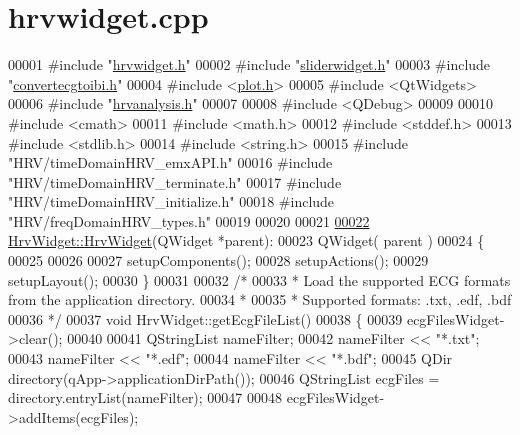 \hypertarget{hrvwidget_8cpp_source}{}\section{hrvwidget.\+cpp}
\label{hrvwidget_8cpp_source}

\begin{DoxyCode}
00001 \textcolor{preprocessor}{#include "\hyperlink{hrvwidget_8h}{hrvwidget.h}"}
00002 \textcolor{preprocessor}{#include "\hyperlink{sliderwidget_8h}{sliderwidget.h}"}
00003 \textcolor{preprocessor}{#include "\hyperlink{convertecgtoibi_8h}{convertecgtoibi.h}"}
00004 \textcolor{preprocessor}{#include <\hyperlink{plot_8h}{plot.h}>}
00005 \textcolor{preprocessor}{#include <QtWidgets>}
00006 \textcolor{preprocessor}{#include "\hyperlink{hrvanalysis_8h}{hrvanalysis.h}"}
00007 
00008 \textcolor{preprocessor}{#include <QDebug>}
00009 
00010 \textcolor{preprocessor}{#include <cmath>}
00011 \textcolor{preprocessor}{#include <math.h>}
00012 \textcolor{preprocessor}{#include <stddef.h>}
00013 \textcolor{preprocessor}{#include <stdlib.h>}
00014 \textcolor{preprocessor}{#include <string.h>}
00015 \textcolor{preprocessor}{#include "HRV/timeDomainHRV\_emxAPI.h"}
00016 \textcolor{preprocessor}{#include "HRV/timeDomainHRV\_terminate.h"}
00017 \textcolor{preprocessor}{#include "HRV/timeDomainHRV\_initialize.h"}
00018 \textcolor{preprocessor}{#include "HRV/freqDomainHRV\_types.h"}
00019 
00020 
00021 
\hypertarget{hrvwidget_8cpp_source.tex_l00022}{}\hyperlink{classHrvWidget_adfd3a1b7a3c35e4380208cbe8d620c88}{00022} \hyperlink{classHrvWidget_adfd3a1b7a3c35e4380208cbe8d620c88}{HrvWidget::HrvWidget}(QWidget *parent):
00023 QWidget( parent )
00024 \{
00025 
00026 
00027     setupComponents();
00028     setupActions();
00029     setupLayout();
00030 \}
00031 
00032 \textcolor{comment}{/*}
00033 \textcolor{comment}{ * Load the supported ECG formats from the application directory.}
00034 \textcolor{comment}{ *}
00035 \textcolor{comment}{ * Supported formats: .txt, .edf, .bdf}
00036 \textcolor{comment}{ */}
00037 \textcolor{keywordtype}{void} HrvWidget::getEcgFileList()
00038 \{
00039     ecgFilesWidget->clear();
00040 
00041     QStringList nameFilter;
00042     nameFilter << \textcolor{stringliteral}{"*.txt"};
00043     nameFilter << \textcolor{stringliteral}{"*.edf"};
00044     nameFilter << \textcolor{stringliteral}{"*.bdf"};
00045     QDir directory(qApp->applicationDirPath());
00046     QStringList ecgFiles = directory.entryList(nameFilter);
00047 
00048     ecgFilesWidget->addItems(ecgFiles);

\end{DoxyCode}
